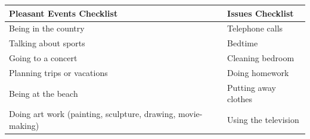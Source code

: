 \documentclass[
]{book}
\begin{document}
\begin{longtable}[]{@{}ll@{}}
\toprule
\begin{minipage}[b]{0.50\columnwidth}\raggedright
Pleasant Events Checklist\strut
\end{minipage} & \begin{minipage}[b]{0.44\columnwidth}\raggedright
Issues Checklist\strut
\end{minipage}\tabularnewline
\midrule
\endhead
\begin{minipage}[t]{0.50\columnwidth}\raggedright
Being in the country\strut
\end{minipage} & \begin{minipage}[t]{0.44\columnwidth}\raggedright
Telephone calls\strut
\end{minipage}\tabularnewline
\begin{minipage}[t]{0.50\columnwidth}\raggedright
Talking about sports\strut
\end{minipage} & \begin{minipage}[t]{0.44\columnwidth}\raggedright
Bedtime\strut
\end{minipage}\tabularnewline
\begin{minipage}[t]{0.50\columnwidth}\raggedright
Going to a concert\strut
\end{minipage} & \begin{minipage}[t]{0.44\columnwidth}\raggedright
Cleaning bedroom\strut
\end{minipage}\tabularnewline
\begin{minipage}[t]{0.50\columnwidth}\raggedright
Planning trips or vacations\strut
\end{minipage} & \begin{minipage}[t]{0.44\columnwidth}\raggedright
Doing homework\strut
\end{minipage}\tabularnewline
\begin{minipage}[t]{0.50\columnwidth}\raggedright
Being at the beach\strut
\end{minipage} & \begin{minipage}[t]{0.44\columnwidth}\raggedright
Putting away clothes\strut
\end{minipage}\tabularnewline
\begin{minipage}[t]{0.50\columnwidth}\raggedright
Doing art work (painting, sculpture, drawing, movie-making)\strut
\end{minipage} & \begin{minipage}[t]{0.44\columnwidth}\raggedright
Using the television\strut
\end{minipage}\tabularnewline

\end{longtable}
\end{document}
